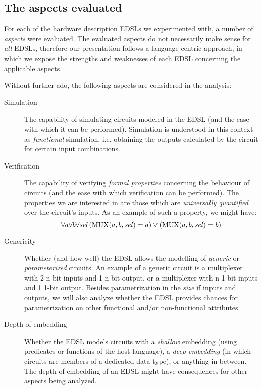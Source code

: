     \subsection{The aspects evaluated}
    \label{subsec:aspects}

        For each of the hardware description EDSLs we experimented with, a number of \emph{aspects}
        were evaluated. The evaluated aspects do not necessarily make sense for \emph{all} EDSLs,
        therefore our presentation follows a language-centric approach, in which we expose the
        strengths and weaknesses of each EDSL concerning the applicable aspects.

        Without further ado, the following aspects are considered in the analysis:

        \begin{description}

            \item[Simulation] The capability of simulating circuits modeled in the EDSL (and the
            ease with which it can be performed). Simulation is understood in this context as
            \emph{functional} simulation, i.e, obtaining the outputs calculated by the circuit for
            certain input combinations.

            \item[Verification] The capability of verifying \emph{formal properties} concerning the
            behaviour of circuits (and the ease with which verification can be performed). The
            properties we are interested in are those which are \emph{universally quantified} over
            the circuit's inputs. As an example of such a property, we might have: \[ \forall a
            \forall b \forall \text{\textit{sel}} \left( \text{MUX}(a,b,\text{\textit{sel}}) = a
            \right) \vee \left( \text{MUX}(a,b,\text{\textit{sel}}) = b \right) \]

            \item[Genericity] Whether (and how well) the EDSL allows the modelling of \emph{generic}
            or \emph{parameterized} circuits. An example of a generic circuit is a multiplexer with
            2 n-bit inputs and 1 n-bit output, or a multiplexer with n 1-bit inputs and 1 1-bit
            output. Besides parametrization in the \emph{size} if inputs and outputs, we will also
            analyze whether the EDSL provides chances for parametrization on other functional and/or
            non-functional attributes.

            \item[Depth of embedding] Whether the EDSL models circuits with a \emph{shallow}
            embedding (using predicates or functions of the host language), a \emph{deep embedding}
            (in which circuits are members of a dedicated data type), or anything in between. The
            depth of embedding of an EDSL might have consequences for other aspects being analyzed.


\end{description}
